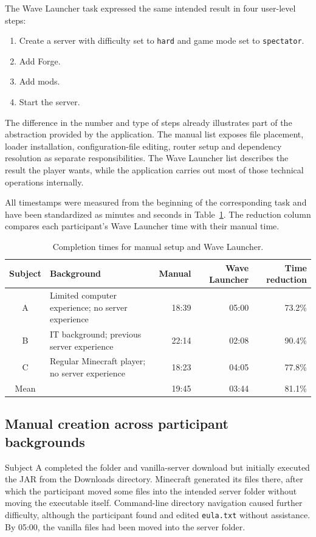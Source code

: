 The Wave Launcher task expressed the same intended result in four user-level steps:

\begin{enumerate}
  \item Create a server with difficulty set to \texttt{hard} and game mode set to \texttt{spectator}.
  \item Add Forge.
  \item Add mods.
  \item Start the server.
\end{enumerate}

The difference in the number and type of steps already illustrates part of the abstraction provided by the application. The manual list exposes file placement, loader installation, configuration-file editing, router setup and dependency resolution as separate responsibilities. The Wave Launcher list describes the result the player wants, while the application carries out most of those technical operations internally.

All timestamps were measured from the beginning of the corresponding task and have been standardized as minutes and seconds in Table~\ref{tab:manual-wave-users}. The reduction column compares each participant's Wave Launcher time with their manual time.

\begin{table}[htbp]
\centering
\caption{Completion times for manual setup and Wave Launcher.}
\label{tab:manual-wave-users}
\small
\begin{tabularx}{\textwidth}{cXrrr}
\toprule
Subject & Background & Manual & Wave Launcher & Time reduction \\
\midrule
A & Limited computer experience; no server experience & 18:39 & 05:00 & 73.2\% \\
B & IT background; previous server experience & 22:14 & 02:08 & 90.4\% \\
C & Regular Minecraft player; no server experience & 18:23 & 04:05 & 77.8\% \\
\midrule
Mean & & 19:45 & 03:44 & 81.1\% \\
\bottomrule
\end{tabularx}
\end{table}

\subsection{Manual creation across participant backgrounds}

Subject A completed the folder and vanilla-server download but initially executed the JAR from the Downloads directory. Minecraft generated its files there, after which the participant moved some files into the intended server folder without moving the executable itself. Command-line directory navigation caused further difficulty, although the participant found and edited \texttt{eula.txt} without assistance. By 05:00, the vanilla files had been moved into the server folder.

